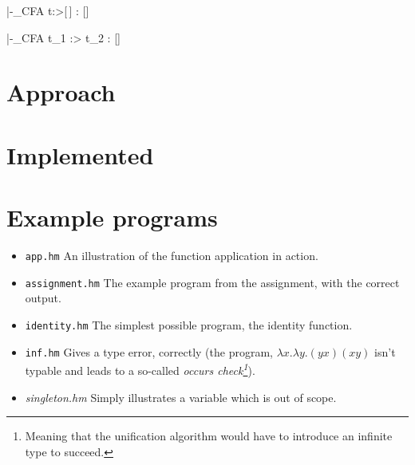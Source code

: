 \documentclass[a4paper]{article}
\begin{document}
{\widehat{\Gamma} |-_{CFA} t\<:>[\,] : [\widehat{\sigma}]}

{\widehat{\Gamma} |-_{CFA} t_1 \<:> t_2 :  [\widehat{\sigma}]}

\section{Approach}


\section{Implemented}

\section{Example programs}

\begin{itemize}
    \item \texttt{app.hm} An illustration of the function application in action. 
    \item \texttt{assignment.hm} The example program from the assignment, with
        the correct output. 
    \item \texttt{identity.hm} The simplest possible program, the identity
        function. 
    \item \texttt{inf.hm} Gives a type error, correctly (the program, $\lambda
        x.
        \lambda y . (y x) (x y)$ isn't typable and leads to a so-called
        \emph{occurs check\footnote{Meaning that the unification algorithm would
        have to introduce an infinite type to succeed.}}).
    \item \textit{singleton.hm} Simply illustrates a variable which is out of
        scope. 
\end{itemize}
\end{document}
